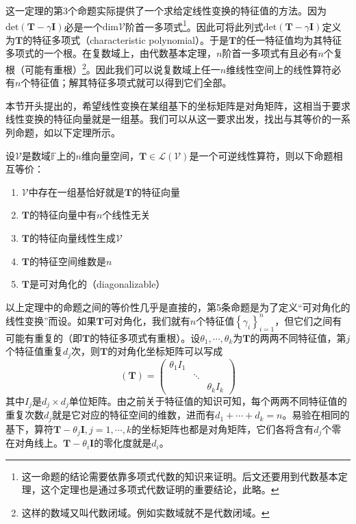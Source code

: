 \documentclass[main.tex]{subfiles}
\begin{document}
这一定理的第3个命题实际提供了一个求给定线性变换的特征值的方法。因为$\mathrm{det}\left(\mathbf{T}-\gamma\mathbf{I}\right)$必是一个$\mathrm{dim}\mathcal{V}$阶首一多项式\footnote{这一命题的结论需要依靠多项式代数的知识来证明。后文还要用到代数基本定理，这个定理也是通过多项式代数证明的重要结论，此略。}。因此可将此列式$\mathrm{det}\left(\mathbf{T}-\gamma\mathbf{I}\right)$定义为$\mathbf{T}$的特征多项式（characteristic polynomial）。于是$\mathbf{T}$的任一特征值均为其特征多项式的一个根。在复数域上，由代数基本定理，$n$阶首一多项式有且必有$n$个复根（可能有重根）\footnote{这样的数域又叫代数闭域。例如实数域就不是代数闭域。}。因此我们可以说复数域上任一$n$维线性空间上的线性算符必有$n$个特征值；解其特征多项式就可以得到它们全部。

本节开头提出的，希望线性变换在某组基下的坐标矩阵是对角矩阵，这相当于要求线性变换的特征向量就是一组基。我们可以从这一要求出发，找出与其等价的一系列命题，如以下定理所示。

\begin{theorem}
设$\mathcal{V}$是数域$\mathbb{F}$上的$n$维向量空间，$\mathbf{T}\in\mathcal{L}\left(\mathcal{V}\right)$是一个可逆线性算符，则以下命题相互等价：
\begin{enumerate}
    \item $\mathcal{V}$中存在一组基恰好就是$\mathbf{T}$的特征向量
    \item $\mathbf{T}$的特征向量中有$n$个线性无关
    \item $\mathbf{T}$的特征向量线性生成$\mathcal{V}$
    \item $\mathbf{T}$的特征空间维数是$n$
    \item $\mathbf{T}$是可对角化的（diagonalizable）
\end{enumerate}
\end{theorem}

以上定理中的命题之间的等价性几乎是直接的\cite[\S5.2“矩阵可对角化的条件”,p.123]{周胜林2012线性代数}，第5条命题是为了定义“可对角化的线性变换”而设。如果$\mathbf{T}$可对角化，我们就有$n$个特征值$\left\{\gamma_i\right\}_{i=1}^n$，但它们之间有可能有重复的（即$\mathbf{T}$的特征多项式有重根）。设$\theta_1,\cdots,\theta_k$为$\mathbf{T}$的两两不同特征值，第$j$个特征值重复$d_j$次，则$\mathbf{T}$的对角化坐标矩阵可以写成
\[\left(\mathbf{T}\right)=\left(\begin{array}{ccc}\theta_1I_1&&\\&\ddots&\\&&\theta_kI_k\end{array}\right)\]
其中$I_j$是$d_j\times d_j$单位矩阵。由之前关于特征值的知识可知，每个两两不同特征值的重复次数$d_j$就是它对应的特征空间的维数，进而有$d_1+\cdots+d_k=n$。易验在相同的基下，算符$\mathbf{T}-\theta_j\mathbf{I},j=1,\cdots,k$的坐标矩阵也都是对角矩阵，它们各将含有$d_j$个零在对角线上。$\mathbf{T}-\theta_i\mathbf{I}$的零化度就是$d_i$。
\end{document}
